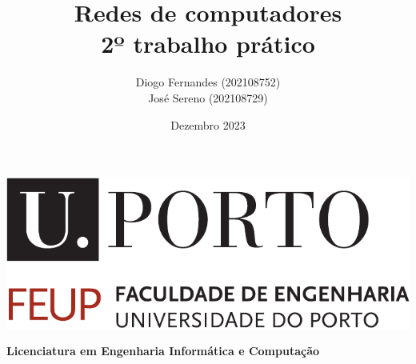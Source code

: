 \documentclass[11pt,a4paper]{article}
\title{%
  Redes de computadores \\
  \large 2º trabalho prático}
\author{%
        Diogo Fernandes (202108752) \\ 
        José Sereno (202108729)}
\date{Dezembro 2023}
\def\course{Licenciatura em Engenharia Informática e Computação}
\begin{document}
    
\begin{titlepage}
    \begin{center}
        \includegraphics[width=0.8\linewidth]{images/uporto-feup.pdf} 
        \vspace{1cm}

        \LARGE
        \textbf{\thetitle}
        \vfill

        \large
        \textbf{\course}
        \vspace{0.5cm}

        \large
        \textbf{\theauthor}
        \vspace{0.5cm}

        \large
        \thedate
    \end{center}
\end{titlepage}

\tableofcontents
\end{document}
